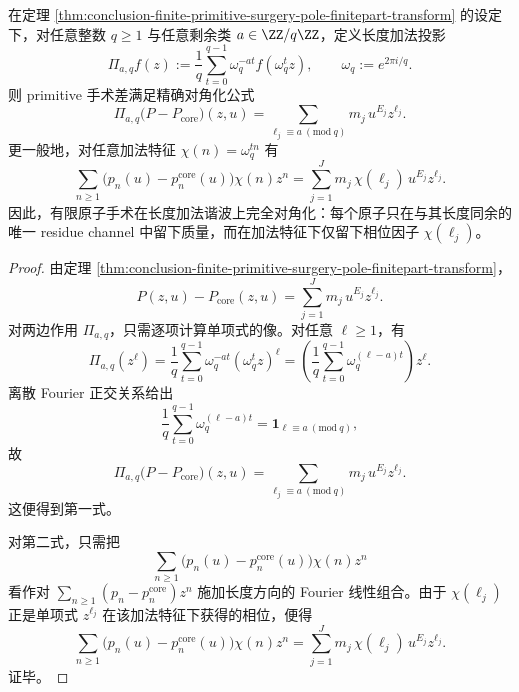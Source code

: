 \begin{theorem}[有限原子手术在长度加法谐波上的完全对角化]\label{thm:conclusion-finite-primitive-surgery-additive-harmonic-diagonalization}
在定理 \ref{thm:conclusion-finite-primitive-surgery-pole-finitepart-transform} 的设定下，对任意整数 \(q\ge 1\) 与任意剩余类 \(a\in \ZZ/q\ZZ\)，定义长度加法投影
\[
\Pi_{a,q}f(z):=\frac{1}{q}\sum_{t=0}^{q-1}\omega_q^{-at}f(\omega_q^t z),
\qquad
\omega_q:=e^{2\pi i/q}.
\]
则 primitive 手术差满足精确对角化公式
\[
\Pi_{a,q}\!\bigl(P-P_{\mathrm{core}}\bigr)(z,u)
=
\sum_{\ell_j\equiv a\ (\mathrm{mod}\ q)}m_j\,u^{E_j}z^{\ell_j}.
\]
更一般地，对任意加法特征 \(\chi(n)=\omega_q^{tn}\) 有
\[
\sum_{n\ge 1}\bigl(p_n(u)-p_n^{\mathrm{core}}(u)\bigr)\chi(n)z^n
=
\sum_{j=1}^{J}m_j\,\chi(\ell_j)\,u^{E_j}z^{\ell_j}.
\]
因此，有限原子手术在长度加法谐波上完全对角化：每个原子只在与其长度同余的唯一 residue channel 中留下质量，而在加法特征下仅留下相位因子 \(\chi(\ell_j)\)。
\end{theorem}
\begin{proof}
由定理 \ref{thm:conclusion-finite-primitive-surgery-pole-finitepart-transform}，
\[
P(z,u)-P_{\mathrm{core}}(z,u)=\sum_{j=1}^{J}m_j\,u^{E_j}z^{\ell_j}.
\]
对两边作用 \(\Pi_{a,q}\)，只需逐项计算单项式的像。对任意 \(\ell\ge 1\)，有
\[
\Pi_{a,q}(z^\ell)
=
\frac{1}{q}\sum_{t=0}^{q-1}\omega_q^{-at}(\omega_q^t z)^\ell
=
\left(\frac{1}{q}\sum_{t=0}^{q-1}\omega_q^{(\ell-a)t}\right)z^\ell.
\]
离散 Fourier 正交关系给出
\[
\frac{1}{q}\sum_{t=0}^{q-1}\omega_q^{(\ell-a)t}
=
\mathbf 1_{\ell\equiv a\ (\mathrm{mod}\ q)},
\]
故
\[
\Pi_{a,q}\!\bigl(P-P_{\mathrm{core}}\bigr)(z,u)
=
\sum_{\ell_j\equiv a\ (\mathrm{mod}\ q)}m_j\,u^{E_j}z^{\ell_j}.
\]
这便得到第一式。

对第二式，只需把
\[
\sum_{n\ge 1}\bigl(p_n(u)-p_n^{\mathrm{core}}(u)\bigr)\chi(n)z^n
\]
看作对 \(\sum_{n\ge 1}(p_n-p_n^{\mathrm{core}})z^n\) 施加长度方向的 Fourier 线性组合。由于 \(\chi(\ell_j)\) 正是单项式 \(z^{\ell_j}\) 在该加法特征下获得的相位，便得
\[
\sum_{n\ge 1}\bigl(p_n(u)-p_n^{\mathrm{core}}(u)\bigr)\chi(n)z^n
=
\sum_{j=1}^{J}m_j\,\chi(\ell_j)\,u^{E_j}z^{\ell_j}.
\]
证毕。
\end{proof}

